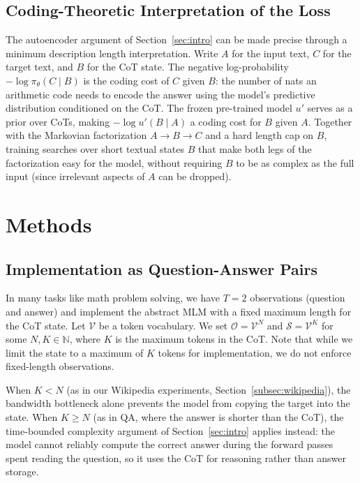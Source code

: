 \documentclass{article} %
\begin{document}
\subsection{Coding-Theoretic Interpretation of the Loss}
\label{subsec:explanation_objective}

The autoencoder argument of Section~\ref{sec:intro} can be made precise through a minimum description length interpretation. Write $A$ for the input text, $C$ for the target text, and $B$ for the CoT state. The negative log-probability $-\log \pi_\theta(C\mid B)$ is the coding cost of $C$ given $B$: the number of nats an arithmetic code needs to encode the answer using the model's predictive distribution conditioned on the CoT. The frozen pre-trained model $u'$ serves as a prior over CoTs, making $-\log u'(B\mid A)$ a coding cost for $B$ given $A$. Together with the Markovian factorization $A \to B \to C$ and a hard length cap on $B$, training searches over short textual states $B$ that make both legs of the factorization easy for the model, without requiring $B$ to be as complex as the full input (since irrelevant aspects of $A$ can be dropped).

\section{Methods}
\label{sec:method}

\subsection{Implementation as Question-Answer Pairs}
In many tasks like math problem solving, we have $T=2$ observations (question and answer) and implement the abstract MLM with a fixed maximum length for the CoT state. Let $\mathcal{V}$ be a token vocabulary. We set $\mathcal{O} = \mathcal{V}^N$ and $\mathcal{S} = \mathcal{V}^K$ for some $N, K \in \mathbb{N}$, where $K$ is the maximum tokens in the CoT. Note that while we limit the state to a maximum of $K$ tokens for implementation, we do not enforce fixed-length observations. 

When $K < N$ (as in our Wikipedia experiments, Section~\ref{subsec:wikipedia}), the bandwidth bottleneck alone prevents the model from copying the target into the state. When $K \geq N$ (as in QA, where the answer is shorter than the CoT), the time-bounded complexity argument of Section~\ref{sec:intro} applies instead: the model cannot reliably compute the correct answer during the forward passes spent reading the question, so it uses the CoT for reasoning rather than answer storage.
\end{document}
